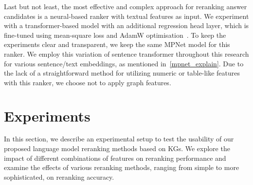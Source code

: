 Last but not least, the most effective and complex approach for reranking answer candidates is a neural-based ranker with textual features as input. We experiment with a transformer-based model with an additional regression head layer, which is fine-tuned using {mean-square loss} and {AdamW} optimisation~\cite{DBLP:conf/iclr/LoshchilovH19-adamw}. To keep the experiments clear and transparent, we keep the same MPNet model for this ranker. We employ this variation of sentence transformer throughout this research for various sentence/text embeddings, as mentioned in~\ref{mpnet_explain}. Due to the lack of a straightforward method for utilizing numeric or table-like features with this ranker, we choose not to apply graph features. 


\section{Experiments}
In this section, we describe an experimental setup to test the usability of our proposed language model reranking methods based on KGs. We explore the impact of different combinations of features on reranking performance and examine the effects of various reranking methods, ranging from simple to more sophisticated, on reranking accuracy.

